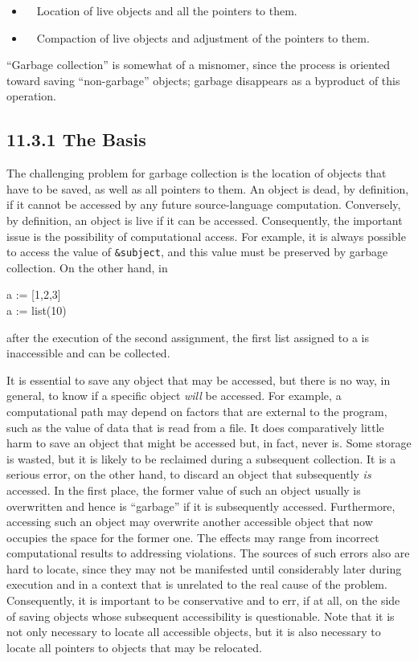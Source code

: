 \liststyleLxii
\begin{itemize}
\item 
\ \ Location of live objects and all the pointers to them.
\item 
\ \ Compaction of live objects and adjustment of the pointers to them.
\end{itemize}

``Garbage collection'' is somewhat of a misnomer, since the process is
oriented toward saving ``non-garbage'' objects; garbage disappears as
a byproduct of this operation.

\subsection[11.3.1 The Basis]{11.3.1 The Basis}

The challenging problem for garbage collection is the location of
objects that have to be saved, as well as all pointers to them. An
object is dead, by definition, if it cannot be accessed by any future
source-language computation.  Conversely, by definition, an object is
live if it can be accessed. Consequently, the important issue is the
possibility of computational access. For example, it is always
possible to access the value of \texttt{\&subject}, and this value
must be preserved by garbage collection. On the other hand, in

\begin{iconcode}
\>a := [1,2,3]\\
\>a := list(10)
\end{iconcode}

\noindent after the execution of the second assignment, the first list
assigned to a is inaccessible and can be collected.

It is essential to save any object that may be accessed, but there is
no way, in general, to know if a specific object \textit{will} be
accessed. For example, a computational path may depend on factors that
are external to the program, such as the value of data that is read
from a file. It does comparatively little harm to save an object that
might be accessed but, in fact, never is. Some storage is wasted, but
it is likely to be reclaimed during a subsequent collection. It is a
serious error, on the other hand, to discard an object that
subsequently \textit{is} accessed. In the first place, the former
value of such an object usually is overwritten and hence is
``garbage'' if it is subsequently accessed. Furthermore, accessing
such an object may overwrite another accessible object that now
occupies the space for the former one. The effects may range from
incorrect computational results to addressing violations. The sources
of such errors also are hard to locate, since they may not be
manifested until considerably later during execution and in a context
that is unrelated to the real cause of the problem. Consequently, it
is important to be conservative and to err, if at all, on the side of
saving objects whose subsequent accessibility is questionable. Note
that it is not only necessary to locate all accessible objects, but it
is also necessary to locate all pointers to objects that may be
relocated.

